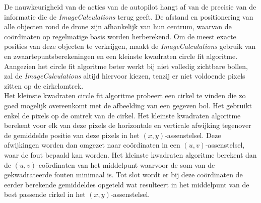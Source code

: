 \noindent
De nauwkeurigheid van de acties van de autopilot hangt af van de precisie van de informatie die de \textit{ImageCalculations} terug geeft. De afstand en positionering van alle objecten rond de drone zijn afhankelijk van hun centrum, waarvan de co\"ordinaten op regelmatige basis worden herberekend. Om de meest exacte posities van deze objecten te verkrijgen, maakt de \textit{ImageCalculations} gebruik van en zwaartepuntsberekeningen en een kleinste kwadraten circle fit algoritme. Aangezien het circle fit algoritme beter werkt bij niet volledig zichtbare bollen, zal de \textit{ImageCalculations} altijd hiervoor kiezen, tenzij er niet voldoende pixels zitten op de cirkelomtrek.
\\
Het kleinste kwadraten circle fit algoritme probeert een cirkel te vinden die zo goed mogelijk overeenkomt met de afbeelding van een gegeven bol\cite{website:kleinsteKwadraten}. Het gebruikt enkel de pixels op de omtrek van de cirkel. Het kleinste kwadraten algoritme berekent voor elk van deze pixels de horizontale en verticale afwijking tegenover de gemiddelde positie van deze pixels in het \((x,y)\)-assenstelsel. Deze afwijkingen worden dan omgezet naar co\"ordinaten in een \((u,v)\)-assenstelsel, waar de fout bepaald kan worden. Het kleinste kwadraten algoritme berekent dan de \((u,v)\)-co\"ordinaten van het middelpunt waarvoor de som van de gekwadrateerde fouten minimaal is. Tot slot wordt er bij deze co\"ordinaten de eerder berekende gemiddeldes opgeteld wat resulteert in het middelpunt van de best passende cirkel in het \((x,y)\)-assenstelsel. 